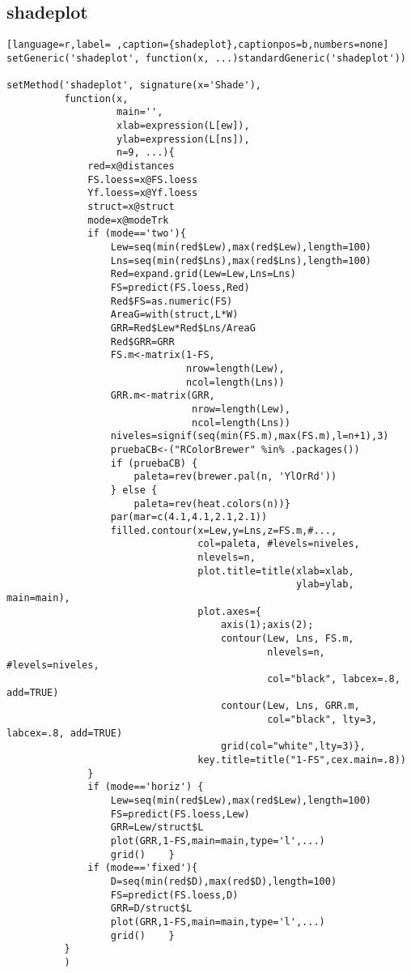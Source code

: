 \subsection{shadeplot}
\label{sec:orgb792897}
\label{subsec:shadeplot}
\begin{lstlisting}[language=r,label= ,caption={shadeplot},captionpos=b,numbers=none]
setGeneric('shadeplot', function(x, ...)standardGeneric('shadeplot'))

setMethod('shadeplot', signature(x='Shade'),
          function(x,
                   main='',
                   xlab=expression(L[ew]),
                   ylab=expression(L[ns]),
                   n=9, ...){
              red=x@distances
              FS.loess=x@FS.loess
              Yf.loess=x@Yf.loess
              struct=x@struct
              mode=x@modeTrk
              if (mode=='two'){
                  Lew=seq(min(red$Lew),max(red$Lew),length=100)
                  Lns=seq(min(red$Lns),max(red$Lns),length=100)
                  Red=expand.grid(Lew=Lew,Lns=Lns)
                  FS=predict(FS.loess,Red)
                  Red$FS=as.numeric(FS)
                  AreaG=with(struct,L*W)
                  GRR=Red$Lew*Red$Lns/AreaG
                  Red$GRR=GRR
                  FS.m<-matrix(1-FS,
                               nrow=length(Lew),
                               ncol=length(Lns))
                  GRR.m<-matrix(GRR,
                                nrow=length(Lew),
                                ncol=length(Lns))
                  niveles=signif(seq(min(FS.m),max(FS.m),l=n+1),3)
                  pruebaCB<-("RColorBrewer" %in% .packages())
                  if (pruebaCB) {
                      paleta=rev(brewer.pal(n, 'YlOrRd'))
                  } else {
                      paleta=rev(heat.colors(n))}
                  par(mar=c(4.1,4.1,2.1,2.1)) 
                  filled.contour(x=Lew,y=Lns,z=FS.m,#...,
                                 col=paleta, #levels=niveles,
                                 nlevels=n,
                                 plot.title=title(xlab=xlab,
                                                  ylab=ylab, main=main),
                                 plot.axes={
                                     axis(1);axis(2);
                                     contour(Lew, Lns, FS.m,
                                             nlevels=n, #levels=niveles,
                                             col="black", labcex=.8,  add=TRUE)
                                     contour(Lew, Lns, GRR.m,
                                             col="black", lty=3, labcex=.8, add=TRUE)
                                     grid(col="white",lty=3)},
                                 key.title=title("1-FS",cex.main=.8))
              }
              if (mode=='horiz') {
                  Lew=seq(min(red$Lew),max(red$Lew),length=100)
                  FS=predict(FS.loess,Lew)
                  GRR=Lew/struct$L
                  plot(GRR,1-FS,main=main,type='l',...)
                  grid()    }
              if (mode=='fixed'){
                  D=seq(min(red$D),max(red$D),length=100)
                  FS=predict(FS.loess,D)
                  GRR=D/struct$L
                  plot(GRR,1-FS,main=main,type='l',...)
                  grid()    }
          }
          )
\end{lstlisting}
